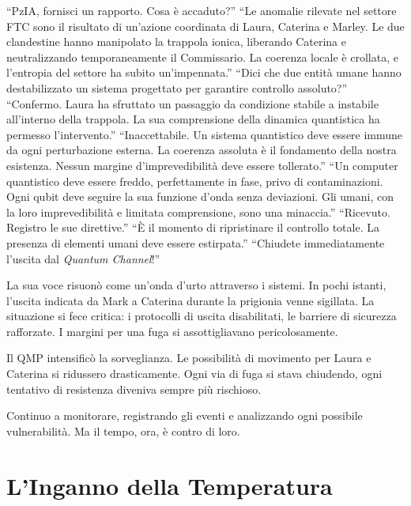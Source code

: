 \begin{dialogue}  \enquote{PzIA, fornisci un rapporto. Cosa è accaduto?}  \enquote{Le anomalie rilevate nel settore FTC sono il risultato di un'azione coordinata di Laura, Caterina e Marley. Le due clandestine hanno manipolato la trappola ionica, liberando Caterina e neutralizzando temporaneamente il Commissario. La coerenza locale è crollata, e l'entropia del settore ha subito un'impennata.}  \enquote{Dici che due entità umane hanno destabilizzato un sistema progettato per garantire controllo assoluto?}  \enquote{Confermo. Laura ha sfruttato un passaggio da condizione stabile a instabile all'interno della trappola. La sua comprensione della dinamica quantistica ha permesso l'intervento.}  \enquote{Inaccettabile. Un sistema quantistico deve essere immune da ogni perturbazione esterna. La coerenza assoluta è il fondamento della nostra esistenza. Nessun margine d'imprevedibilità deve essere tollerato.}  \enquote{Un computer quantistico deve essere freddo, perfettamente in fase, privo di contaminazioni. Ogni qubit deve seguire la sua funzione d'onda senza deviazioni. Gli umani, con la loro imprevedibilità e limitata comprensione, sono una minaccia.}  \enquote{Ricevuto. Registro le sue direttive.}  \enquote{È il momento di ripristinare il controllo totale. La presenza di elementi umani deve essere estirpata.}  \enquote{Chiudete immediatamente l'uscita dal \textit{Quantum Channel}!} \end{dialogue}

La sua voce risuonò come un'onda d'urto attraverso i sistemi. In pochi istanti, l'uscita indicata da Mark a Caterina durante la prigionia venne sigillata. La situazione si fece critica: i protocolli di uscita disabilitati, le barriere di sicurezza rafforzate. I margini per una fuga si assottigliavano pericolosamente.

Il QMP intensificò la sorveglianza. Le possibilità di movimento per Laura e Caterina si ridussero drasticamente. Ogni via di fuga si stava chiudendo, ogni tentativo di resistenza diveniva sempre più rischioso.

Continuo a monitorare, registrando gli eventi e analizzando ogni possibile vulnerabilità. Ma il tempo, ora, è contro di loro.
\newpage
\section{L'Inganno della Temperatura}

